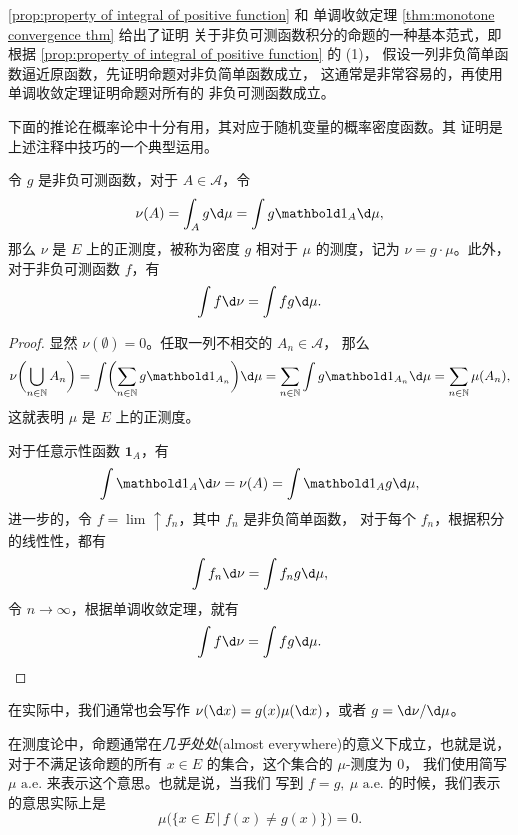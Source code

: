 \documentclass[fontset=none]{Notes}
\newcommand{\ulim}[1][]{\lim_{#1}\mathrel{\uparrow}}
\newcommand{\indicator}[1]{\mathbold 1_{#1}}
\newcommand{\alev}[1]{\text{$#1$ a.e.}}
\begin{document}
\begin{remark}
  \autoref{prop:property of integral of positive function} 和
  单调收敛定理 \ref{thm:monotone convergence thm} 给出了证明
  关于非负可测函数积分的命题的一种基本范式，即根据
  \autoref{prop:property of integral of positive function} 的 (1)，
  假设一列非负简单函数逼近原函数，先证明命题对非负简单函数成立，
  这通常是非常容易的，再使用单调收敛定理证明命题对所有的
  非负可测函数成立。
\end{remark}

下面的推论在概率论中十分有用，其对应于随机变量的概率密度函数。其
证明是上述注释中技巧的一个典型运用。

\begin{corollary}\label{coro:density of measure}
  令 $g$ 是非负可测函数，对于 $A\in \mathcal{A}$，令
  \[
    \nu(A)=\int_A g\d\mu=\int g\mathbold 1_A \d\mu,
  \]
  那么 $\nu$ 是 $E$ 上的正测度，被称为密度 $g$ 相对于 $\mu$
  的测度，记为 $\nu=g\cdot \mu$。此外，对于非负可测函数
  $f$，有
  \[
    \int f\d\nu=\int fg\d\mu.
  \]
\end{corollary}
\begin{proof}
  显然 $\nu(\emptyset)=0$。任取一列不相交的 $A_n\in \mathcal{A}$，
  那么
  \[
    \nu\biggl(\bigcup_{n\in \mathbb{N}}A_n\biggr)  
    =\int \biggl(\sum_{n\in \mathbb{N}}g\mathbold 1_{A_n}\biggr)
    \d\mu=\sum_{n\in \mathbb{N}}\int g\mathbold 1_{A_n}\d\mu
    =\sum_{n\in \mathbb{N}}\mu(A_n),
  \]
  这就表明 $\mu$ 是 $E$ 上的正测度。

  对于任意示性函数 $\mathbold 1_A$，有
  \[
    \int \indicator{A}\d\nu=\nu(A)=\int \indicator{A}g\d\mu,
  \]
  进一步的，令 $f=\ulim f_n$，其中 $f_n$ 是非负简单函数，
  对于每个 $f_n$，根据积分的线性性，都有
  \[
    \int f_n \d\nu=\int f_ng\d\mu, 
  \]
  令 $n\to\infty$，根据单调收敛定理，就有 
  \[
    \int f\d\nu=\int fg\d\mu.\qedhere
  \]
\end{proof}
\begin{remark}
  在实际中，我们通常也会写作 $\nu(\d x)=g(x)\mu(\d x)$，或者
  $g=\d\nu/\d\mu$。
\end{remark}

在测度论中，命题通常在\emph{几乎处处}(almost everywhere)的意义下成立，也就是说，
对于不满足该命题的所有 $x\in E$ 的集合，这个集合的 $\mu$-测度为 $0$，
我们使用简写 $\alev{\mu}$ 来表示这个意思。也就是说，当我们
写到 $f=g,\ \alev{\mu}$ 的时候，我们表示的意思实际上是
\[
  \mu\bigl(\{x\in E\,|\, f(x)\neq g(x)\}\bigr)=0.
\]
\end{document}
